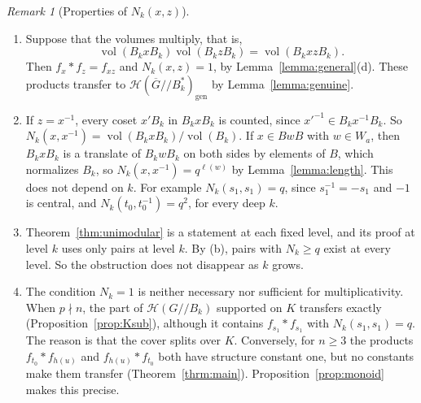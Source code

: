 \documentclass[12pt,letterpaper]{amsart}
\numberwithin{equation}{section}
\theoremstyle{definition}
\theoremstyle{remark}
\newtheorem{remark}[theorem]{Remark}
\DeclareMathOperator{\vol}{vol}
\newcommand{\cH}{\mathcal{H}}
\newcommand{\Gbar}{\overline{G}}
\newcommand{\gen}{\mathrm{gen}}
\newcommand{\Hgen}{\cH(\Gbar/\!/B_k^*)_{\gen}}
\newcommand{\Hlin}{\cH(G/\!/B_k)}
\begin{document}
\begin{remark}[Properties of $N_k(x,z)$]
\label{rem:Nk}
\begin{enumerate}[leftmargin=2em,label=(\alph*)]
\item Suppose that the volumes multiply, that is,
\[
\vol(B_kxB_k)\vol(B_kzB_k)=\vol(B_kxzB_k).
\]
Then $f_x*f_z=f_{xz}$ and $N_k(x,z)=1$, by
Lemma~\ref{lemma:general}(d).
These products transfer to $\Hgen$ by Lemma~\ref{lemma:genuine}.
\item If $z=x^{-1}$, every coset $x'B_k$ in $B_kxB_k$ is counted, since
$x'^{-1}\in B_kx^{-1}B_k$. So $N_k(x,x^{-1})=\vol(B_kxB_k)/\vol(B_k)$.
If $x\in BwB$ with $w\in W_a$, then $B_kxB_k$ is a translate of
$B_kwB_k$ on both sides by elements of $B$, which normalizes $B_k$, so
$N_k(x,x^{-1})=q^{\ell(w)}$ by Lemma~\ref{lemma:length}. This does not
depend on $k$. For example $N_k(s_1,s_1)=q$, since $s_1^{-1}=-s_1$ and
$-1$ is central, and $N_k(t_0,t_0^{-1})=q^2$, for every deep $k$.
\item Theorem~\ref{thm:unimodular} is a statement at each fixed level,
and its proof at level $k$ uses only pairs at level $k$. By (b), pairs
with $N_k\geq q$ exist at every level. So the obstruction does not
disappear as $k$ grows.
\item The condition $N_k=1$ is neither necessary nor sufficient for
multiplicativity. When $p\nmid n$, the part of $\Hlin$ supported on
$K$ transfers exactly (Proposition~\ref{prop:Ksub}), although it
contains $f_{s_1}*f_{s_1}$ with $N_k(s_1,s_1)=q$. The reason is that
the cover splits over $K$. Conversely, for $n\geq3$ the products
$f_{t_0}*f_{h(u)}$ and $f_{h(u)}*f_{t_0}$ both have structure constant
one, but no constants make them transfer (Theorem~\ref{thrm:main}).
Proposition~\ref{prop:monoid} makes this precise.
\end{enumerate}
\end{remark}
\end{document}
